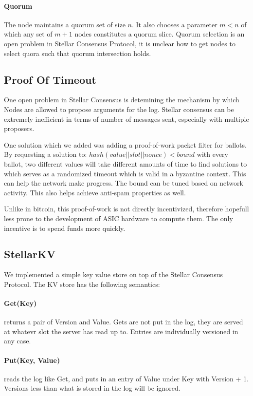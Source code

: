 \documentclass[preprint,11pt]{article} \usepackage{amsmath}
\begin{document}
\paragraph{Quorum}
The node maintains a quorum set of size $n$. It also chooses a
parameter $m < n$ of which any set of $m+1$ nodes constitutes a quorum
slice. Quorum selection is an open problem in Stellar Consensus
Protocol, it is unclear how to get nodes to select quora such that
quorum intersection holds.

\subsection{Proof Of Timeout}
One open problem in Stellar Consensus is detemining the mechanism by
which Nodes are allowed to propose arguments for the log. Stellar
consensus can be extremely inefficient in terms of number of messages
sent, especially with multiple proposers.

One solution which we added was adding a proof-of-work packet filter
for ballots. By requesting a solution to: $hash(value || slot ||
nonce) < bound$ with every ballot, two different values will take
different amounts of time to find solutions to which serves as a
randomized timeout which is valid in a byzantine context. This can
help the network make progress. The bound can be tuned based on
network activity. This also helps achieve anti-spam properties as
well.

Unlike in bitcoin, this proof-of-work is not directly incentivized,
therefore hopefull less prone to the development of ASIC hardware to
compute them. The only incentive is to spend funds more quickly.

\subsection{StellarKV}
We implemented a simple key value store on top of the Stellar
Consensus Protocol. The KV store has the following semantics:

\paragraph{Get(Key)} returns a pair of Version and Value. Gets are not put in the log, they are served
at whatevr slot the server has read up to. Entries are individually
versioned in any case.
\paragraph{Put(Key, Value)}  reads the log like Get, and puts in an entry of Value under Key with Version + 1. Versions less than what is stored in the log will be ignored.
\end{document}
